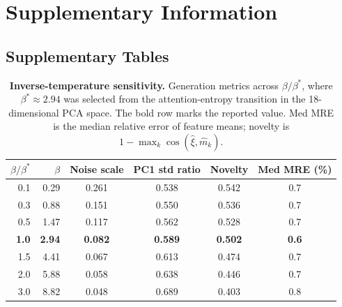 
\setcounter{section}{0}
\setcounter{figure}{0}
\setcounter{table}{0}
\setcounter{equation}{0}
\renewcommand{\thesection}{S\arabic{section}}
\renewcommand{\thefigure}{S\arabic{figure}}
\renewcommand{\thetable}{S\arabic{table}}
\renewcommand{\theequation}{S\arabic{equation}}

\section*{Supplementary Information}

\subsection*{Supplementary Tables}

\begin{table}[ht]
\centering
\caption{\textbf{Inverse-temperature sensitivity.} Generation metrics across
$\beta/\beta^*$, where $\beta^*\approx2.94$ was selected from the attention-entropy
transition in the 18-dimensional PCA space. The bold row marks the reported value.
Med MRE is the median relative error of feature means; novelty is
$1-\max_k\cos(\hat{\xi},\hat{m}_k)$.}
\label{stab:beta-sweep}
\begin{tabular}{rrcccc}
\toprule
$\beta/\beta^*$ & $\beta$ & Noise scale & PC1 std ratio & Novelty & Med MRE (\%) \\
\midrule
0.1 & 0.29 & 0.261 & 0.538 & 0.542 & 0.7 \\
0.3 & 0.88 & 0.151 & 0.550 & 0.536 & 0.7 \\
0.5 & 1.47 & 0.117 & 0.562 & 0.528 & 0.7 \\
\textbf{1.0} & \textbf{2.94} & \textbf{0.082} & \textbf{0.589} & \textbf{0.502} & \textbf{0.6} \\
1.5 & 4.41 & 0.067 & 0.613 & 0.474 & 0.7 \\
2.0 & 5.88 & 0.058 & 0.638 & 0.446 & 0.7 \\
3.0 & 8.82 & 0.048 & 0.689 & 0.403 & 0.8 \\
\bottomrule
\end{tabular}
\end{table}

